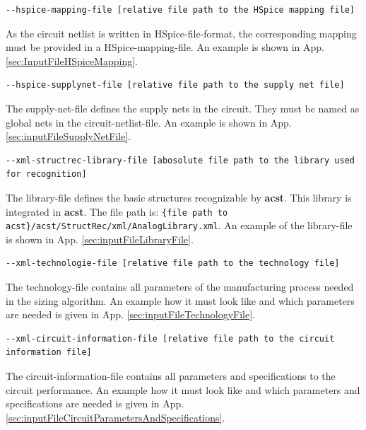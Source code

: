 \begin{lstlisting}[basicstyle=\ttfamily\scriptsize,backgroundcolor={\color{gray!30}}, escapechar=? ]
--hspice-mapping-file [relative file path to the HSpice mapping file]
\end{lstlisting}
As the circuit netlist is written in HSpice-file-format, the corresponding mapping must be provided in a HSpice-mapping-file. An example is shown in App. \ref{sec:InputFileHSpiceMapping}.
\\

\begin{lstlisting}[basicstyle=\ttfamily\scriptsize,backgroundcolor={\color{gray!30}}, escapechar=? ]
--hspice-supplynet-file [relative file path to the supply net file]
\end{lstlisting}
The supply-net-file defines the supply nets in the circuit. They must be named as global nets in the circuit-netlist-file. An example is shown in App. \ref{sec:inputFileSupplyNetFile}.
\\

\begin{lstlisting}[basicstyle=\ttfamily\scriptsize,backgroundcolor={\color{gray!30}}, escapechar=? ]
--xml-structrec-library-file [abosolute file path to the library used for recognition] 
\end{lstlisting}
The library-file defines the basic structures recognizable by {\bf acst}. This library is integrated in {\bf acst}. The file path is: {\tt \{file path to acst\}/acst/StructRec/xml/AnalogLibrary.xml}. An example of the library-file is shown in App. \ref{sec:inputFileLibraryFile}.
\\

\begin{lstlisting}[basicstyle=\ttfamily\scriptsize,backgroundcolor={\color{gray!30}}, escapechar=? ]
--xml-technologie-file [relative file path to the technology file] 
\end{lstlisting}
The technology-file contains all parameters of the manufacturing process needed in the sizing algorithm. An example how it must look like and which parameters are needed is given in App. \ref{sec:inputFileTechnologyFile}.

\begin{lstlisting}[basicstyle=\ttfamily\scriptsize,backgroundcolor={\color{gray!30}}, escapechar=? ]
--xml-circuit-information-file [relative file path to the circuit information file] 
\end{lstlisting}
The circuit-information-file contains all parameters and specifications to the circuit performance. An example how it must look like and which parameters and specifications are needed is given in App. \ref{sec:inputFileCircuitParametersAndSpecifications}.

